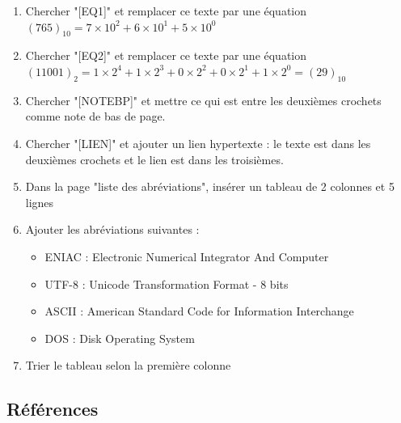 \documentclass[11pt, a4paper]{article}
\begin{document}
\begin{enumerate}
	\item Chercher "[EQ1]" et remplacer ce texte par une équation $ (765)_{10} = 7 \times 10^2 + 6 \times 10^1 + 5 \times 10^0 $
	\item Chercher "[EQ2]" et remplacer ce texte par une équation $ (11001)_{2} = 1 \times 2^4 + 1 \times 2^3 + 0 \times 2^2 + 0 \times 2^1 + 1 \times 2^0 = (29)_{10} $
	\item Chercher "[NOTEBP]" et mettre ce qui est entre les deuxièmes crochets comme note de bas de page. 
	\item  Chercher "[LIEN]" et ajouter un lien hypertexte : le texte est dans les deuxièmes crochets et le lien est dans les troisièmes.
	\item Dans la page "liste des abréviations", insérer un tableau de 2 colonnes et 5 lignes
	\item Ajouter les abréviations suivantes : 
	\begin{multicols}{2}
		\begin{itemize}
			\item ENIAC : Electronic Numerical Integrator And Computer
			\item UTF-8 : Unicode Transformation Format - 8 bits
			\item ASCII : American Standard Code for Information Interchange
			\item DOS : Disk Operating System
		\end{itemize}
	\end{multicols}
	\item Trier le tableau selon la première colonne
\end{enumerate}

\subsection*{Références}
\end{document}
